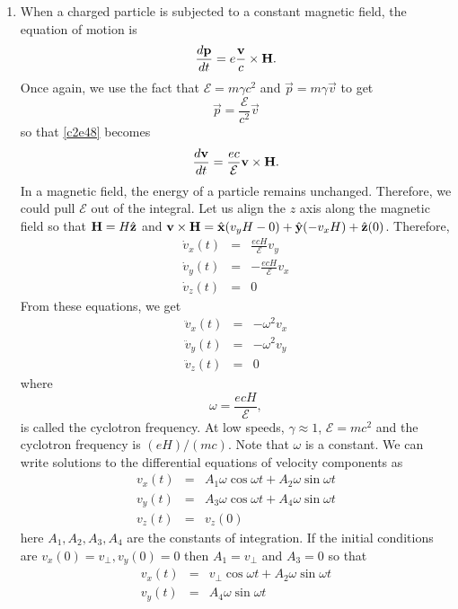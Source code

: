 \begin{enumerate}
\item When a charged particle is subjected to a constant magnetic field, the
equation of motion is
\begin{equation}\label{c3e49}
\frac{d{\mathbf{p}}}{d{t}} = e\frac{\mathbf{v}}{c} \times \mathbf{H}.
\end{equation}
Once again, we use the fact that $\mathcal{E} = m\gamma c^2$ and $\vec{p} = 
m\gamma\vec{v}$ to get
\[
\vec{p} = \frac{\mathcal{E}}{c^2}\vec{v}
\]
so that \eqref{c2e48} becomes
\[
\frac{d{\mathbf{v}}}{d{t}} = \frac{ec}{\mathcal{E}}\mathbf{v} \times \mathbf{H}.
\]
In a magnetic field, the energy of a particle remains unchanged. Therefore, we 
could pull $\mathcal{E}$ out of the integral. Let us align the $z$ axis along
the magnetic field so that $\mathbf{H} = H\hat{\mathbf{z}}$ and $\mathbf{v} \times \mathbf{H} = 
\hat{\mathbf{x}}(v_yH - 0) + \hat{\mathbf{y}}(-v_xH) + \hat{\mathbf{z}}(0)$. Therefore,
\begin{eqnarray*}
\dot{v}_x(t) &=& \frac{ecH}{\mathcal{E}}v_y \\
\dot{v}_y(t) &=& -\frac{ecH}{\mathcal{E}}v_x \\
\dot{v}_z(t) &=& 0
\end{eqnarray*}
From these equations, we get
\begin{eqnarray*}
\ddot{v}_x(t) &=& -\omega^2 v_x \\
\ddot{v}_y(t) &=& -\omega^2 v_y \\
\ddot{v}_z(t) &=& 0
\end{eqnarray*}
where
\begin{equation}\label{c3e50}
\omega = \frac{ecH}{\mathcal{E}},
\end{equation}
is called the cyclotron frequency. At low speeds, $\gamma \approx 1$, $\mathcal{E}
= mc^2$ and the cyclotron frequency is $(eH)/(mc)$. Note that $\omega$ is a 
constant. We can write solutions to the differential equations of velocity
components as
\begin{eqnarray*}
v_x(t) &=& A_1\omega\cos\omega t + A_2\omega\sin\omega t \\
v_y(t) &=& A_3\omega\cos\omega t + A_4\omega\sin\omega t \\
v_z(t) &=& v_z(0)
\end{eqnarray*}
here $A_1, A_2, A_3, A_4$ are the constants of integration. If the initial
conditions are $v_x(0) = v_{\perp}, v_y(0) = 0$ then $A_1 = v_{\perp}$ and 
$A_3 = 0$ so that
\begin{eqnarray*}
v_x(t) &=& v_\perp\cos\omega t + A_2\omega\sin\omega t \\
v_y(t) &=& A_4\omega\sin\omega t \\

\end{eqnarray*}
\end{enumerate}
